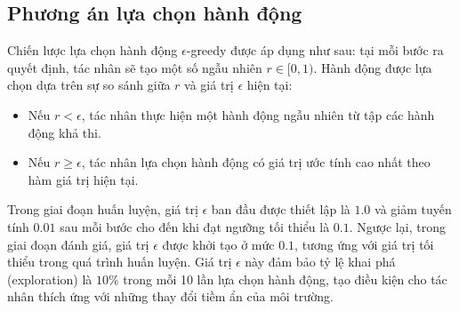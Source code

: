 \subsection{Phương án lựa chọn hành động}

Chiến lược lựa chọn hành động $\epsilon$-greedy được áp dụng như sau: tại mỗi bước ra quyết định, tác nhân sẽ tạo một số ngẫu nhiên $r \in [0, 1)$. Hành động được lựa chọn dựa trên sự so sánh giữa $r$ và giá trị $\epsilon$ hiện tại:
\begin{itemize}
    \item Nếu $r < \epsilon$, tác nhân thực hiện một hành động ngẫu nhiên từ tập các hành động khả thi.
    \item Nếu $r \geq \epsilon$, tác nhân lựa chọn hành động có giá trị ước tính cao nhất theo hàm giá trị hiện tại.
\end{itemize}

Trong giai đoạn huấn luyện, giá trị $\epsilon$ ban đầu được thiết lập là $1.0$ và giảm tuyến tính $0.01$ sau mỗi bước cho đến khi đạt ngưỡng tối thiểu là $0.1$. Ngược lại, trong giai đoạn đánh giá, giá trị $\epsilon$ được khởi tạo ở mức $0.1$, tương ứng với giá trị tối thiểu trong quá trình huấn luyện. Giá trị $\epsilon$ này đảm bảo tỷ lệ khai phá (exploration) là $10\%$ trong mỗi 10 lần lựa chọn hành động, tạo điều kiện cho tác nhân thích ứng với những thay đổi tiềm ẩn của môi trường.